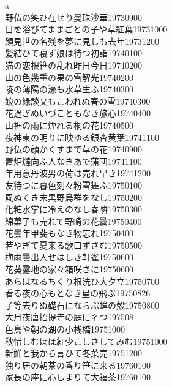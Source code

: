 \begin{multicols}{2}
a
\\野仏の笑ひ在せり曼珠沙華\hfill{19730900}
\\日を浴びてままごとの子や草紅葉\hfill{19731000}
\\顔見世の名残を夢に見しも去年\hfill{19731200}
\\髪結ひて寝ず娘は待つ初詣\hfill{19740100}
\\猫の恋根笹の乱れ昨日今日\hfill{19740200}
\\山の色幾重の果の雪解光\hfill{19740200}
\\陵の薄陽の濠も水草生ふ\hfill{19740300}
\\娘の縁談又もこわれぬ春の雪\hfill{19740300}
\\花過ぎぬいづこともなき旅心\hfill{19740400}
\\山裾の雨に煙れる桐の花\hfill{19740500}
\\夜神東の明りに映ゆる銀杏黄葉\hfill{19741100}
\\野仏の顔かくすまで草の花\hfill{19740900}
\\置炬燵向ふ人なきあで蒲団\hfill{19741100}
\\年用意丹波男の荷は売れ早き\hfill{19741200}
\\友待つに暮色刻々粉雪舞ふ\hfill{19750100}
\\風ぬくき末黒野烏群をなし\hfill{19750200}
\\化粧水掌に冷えのなし春隣\hfill{19750300}
\\綿菓子も売れて野崎の花曇\hfill{19750400}
\\花曇年甲斐もなき物忘れ\hfill{19750400}
\\若やぎて夏来る歌口ずさむ\hfill{19750500}
\\梅雨曇出入せはしき軒雀\hfill{19750600}
\\花葵露地の家々箱咲きに\hfill{19750600}
\\あらはなるちくり根洗ひ大夕立\hfill{19750700}
\\看る夜の心もとなき星の飛ぶ\hfill{19750826}
\\子等去りぬ礎石にならぶ蝉の殻\hfill{19750800}
\\大月夜唐招提寺の庭に彳つ\hfill{197508}
\\色鳥や朝の湖の小桟橋\hfill{19751000}
\\秋惜しむほほ紅少こしさしてみむ\hfill{19751000}
\\新鮮と我から言ひて冬菜売\hfill{19751200}
\\独り居の朝茶の香り笹に来る\hfill{19760100}
\\家長の座に心しまりて大福茶\hfill{19760100}

\end{multicols}
